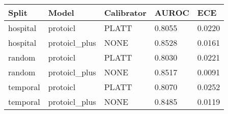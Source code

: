 \begin{tabular}{lllll}
\toprule
Split & Model & Calibrator & AUROC & ECE \\
\midrule
hospital & protoicl & PLATT & 0.8055 & 0.0220 \\
hospital & protoicl_plus & NONE & 0.8528 & 0.0161 \\
random & protoicl & PLATT & 0.8030 & 0.0221 \\
random & protoicl_plus & NONE & 0.8517 & 0.0091 \\
temporal & protoicl & PLATT & 0.8070 & 0.0252 \\
temporal & protoicl_plus & NONE & 0.8485 & 0.0119 \\
\bottomrule
\end{tabular}
